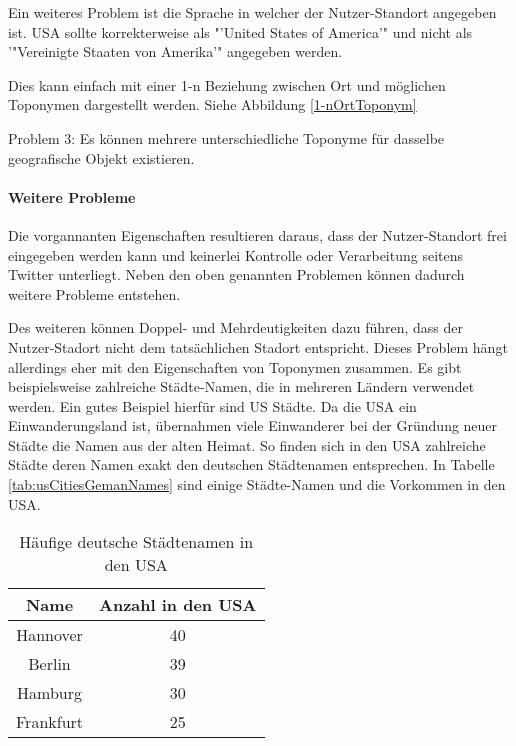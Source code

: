 				Ein weiteres Problem ist die Sprache in welcher der Nutzer-Standort angegeben ist. 
				USA sollte korrekterweise als "'United States of America'" und nicht als '"Vereinigte Staaten von Amerika'" angegeben werden.
				
				Dies kann einfach mit einer 1-n Beziehung zwischen Ort und möglichen Toponymen dargestellt werden.
				Siehe Abbildung \ref{1-nOrtToponym}  

				Problem 3: Es können mehrere unterschiedliche Toponyme für dasselbe geografische Objekt existieren.  
				
			\paragraph{Weitere Probleme}
				Die vorgannanten Eigenschaften resultieren daraus, dass der Nutzer-Standort frei eingegeben werden kann und keinerlei Kontrolle oder Verarbeitung seitens Twitter unterliegt. 
				Neben den oben genannten Problemen können dadurch weitere Probleme entstehen.


				Des weiteren können Doppel- und Mehrdeutigkeiten dazu führen, dass der Nutzer-Stadort nicht dem tatsächlichen Stadort entspricht. 
				Dieses Problem hängt allerdings eher mit den Eigenschaften von Toponymen zusammen.
				Es gibt beispielsweise zahlreiche Städte-Namen, die in mehreren Ländern verwendet werden.
				Ein gutes Beispiel hierfür sind US Städte. 
				Da die USA ein Einwanderungsland ist, übernahmen viele Einwanderer bei der Gründung neuer Städte die Namen aus der alten Heimat. 
				So finden sich in den USA zahlreiche Städte deren Namen exakt den deutschen Städtenamen entsprechen. 
				In Tabelle \ref{tab:usCitiesGemanNames} sind einige Städte-Namen und die Vorkommen in den USA.

				
				\begin{table}[htpb]
					\caption{Häufige deutsche Städtenamen in den USA} 
					\centering
					\begin{tabular}{|c|c|}
						\hline
						Name & Anzahl in den USA \\
						\hline\hline
						Hannover & 40 \\
						\hline
						Berlin & 39 \\
						\hline
						Hamburg & 30 \\
						\hline
						Frankfurt & 25 \\
						\hline
					\end{tabular}
					\label{tab:usCitiesGermanNames} 
				\end{table}


